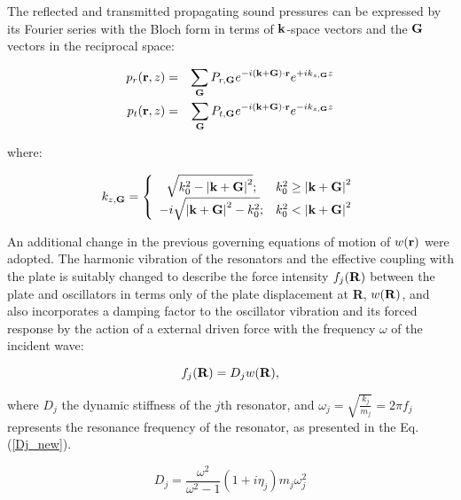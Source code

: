 \documentclass[a4paper]{ICEDyn}
\begin{document}
	The reflected and transmitted propagating sound pressures can be expressed by its Fourier series with the Bloch form in terms of ${\bf k}$-space vectors and the ${ \bf G}$ vectors in the reciprocal space:
	
	\begin{eqnarray}
	p_{r}({\bf r},z) &=& \sum_{{\bf G}}P_{r,{\bf G}}e^{-i\left( {\bf k}+{\bf G}\right)\cdot{\bf r}}e^{+ik_{z,{\bf G}}z}\label{pr}\\
%	
	p_{t}({\bf r},z) &=& \sum_{{\bf G}}P_{t,{\bf G}}e^{-i\left( {\bf k}+{\bf G}\right)\cdot{\bf r}}e^{-ik_{z,{\bf G}}z} \label{pt}
	\end{eqnarray}
	
	where:	
	
	\begin{equation}
	k_{z,{\bf G}} =
	\left\lbrace
	\begin{array}{c l}
	\sqrt{k_{0}^2-\left|{\bf k}+{\bf G}\right|^{2}};&  k_{0}^2\ge\left|{\bf k}+{\bf G}\right|^{2} \\
	-i\sqrt{\left|{\bf k}+{\bf G}\right|^{2}-k_{0}^2};& k_{0}^2 < \left|{\bf k}+{\bf G}\right|^{2}
	\end{array}
	\right .
	\end{equation}
	
	An additional change in the previous governing equations of motion of $w({\bf r})$ were adopted. The  harmonic vibration of the resonators and the effective coupling with the plate is suitably changed to describe the force intensity $f_j({\bf R})$ between the plate and oscillators in terms only of the plate displacement at {\bf R}, $w({\bf R})$, and also incorporates a damping factor to the oscillator vibration and its forced response by the action of a external driven force with the frequency $\omega$ of the incident wave: 
	
	\begin{equation}\label{fj_new}
	f_{j}({\bf R}) = D_{j}w({\bf R}),
	\end{equation}
	
	where $D_j$ the dynamic stiffness of the $j$th resonator, and $ \omega_{j} = \sqrt{\frac{k_{j}}{m_{j}}} = 2\pi f_{j} $ represents the resonance frequency of the resonator, as presented in the Eq. (\ref{Dj_new}). 
	
	\begin{equation}\label{Dj_new}
	D_{j} = \displaystyle \frac{\omega^2} {\omega^2-1}(1+i\eta_{j})m_j\omega^2_j
	\end{equation}
	
\end{document}

